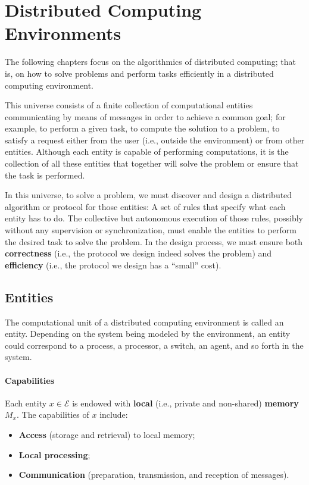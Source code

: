 \section{Distributed Computing Environments}
The following chapters focus on the algorithmics of distributed computing; that is, on how to solve problems and perform tasks efficiently in a distributed computing environment. 

This universe consists of a finite collection of computational entities communicating by means of messages in order to achieve a common goal; for example, to perform a given task, to compute the solution to a problem, to satisfy a request either from the user (i.e., outside the environment) or from other entities. Although each entity is capable of performing computations, it is the collection of all these entities that together will solve the problem or ensure that the task is performed. 

In this universe, to solve a problem, we must discover and design a distributed algorithm or protocol for those entities: A set of rules that specify what each entity has to do. The collective but autonomous execution of those rules, possibly without any supervision or synchronization, must enable the entities to perform the desired task to solve the problem. In the design process, we must ensure both \textbf{correctness} (i.e., the protocol we design indeed solves the problem) and \textbf{efficiency} (i.e., the protocol we design has a “small” cost).

\subsection{Entities}
The computational unit of a distributed computing environment is called an entity. Depending on the system being modeled by the environment, an entity could correspond to a process, a processor, a switch, an agent, and so forth in the system.

\paragraph{Capabilities} Each entity $x \in \mathcal{E}$ is endowed with \textbf{local} (i.e., private and non-shared) \textbf{memory} $M_x$. The capabilities of $x$ include:
\begin{itemize}
    \item \textbf{Access} (storage and retrieval) to local memory;
    \item \textbf{Local processing};
    \item \textbf{Communication} (preparation, transmission, and reception of messages).
\end{itemize}

